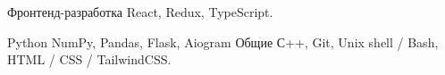 

\begin{cvskills}

  \cvskill
    {Фронтенд-разработка} %
    {React, Redux, TypeScript.} %

  \cvskill
    {Python} %
    {NumPy, Pandas, Flask, Aiogram} %
  \cvskill
    {Общие} %
    {С++, Git, Unix shell / Bash, HTML / CSS / TailwindCSS.} %

\end{cvskills}
